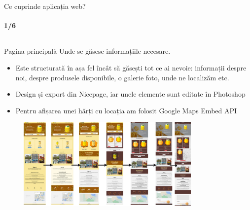 \documentclass{beamer}
\begin{document}
\begin{darkframes}
		
		\begin{frame}[label=math]{Ce cuprinde aplicația web?}
			\vspace{-1em}
			\framesubtitle{1/6}
			\begin{columns}[t]
				\begin{column}{1\textwidth}
					\begin{exampleblock}{Pagina principală}
					    \tiny
						Unde se găsesc \alert{informațiile necesare}.
						\begin{itemize}
							\item Este structurată în așa fel încât să găsești tot ce ai nevoie: informații despre noi, despre produsele disponibile, o galerie foto, unde ne localizăm etc.
							\item Design și export din Nicepage, iar unele elemente sunt editate în Photoshop
							\item Pentru afișarea unei hărți cu locația am folosit Google Maps Embed API
						\end{itemize}
					\end{exampleblock}
					\vspace{-1em}
					\begin{figure}
						\centering
						\includegraphics[width=0.8\textwidth]{evolutie.png}
					\end{figure}
				\end{column}
			\end{columns}
		\end{frame}
		

\end{darkframes}
\end{document}
